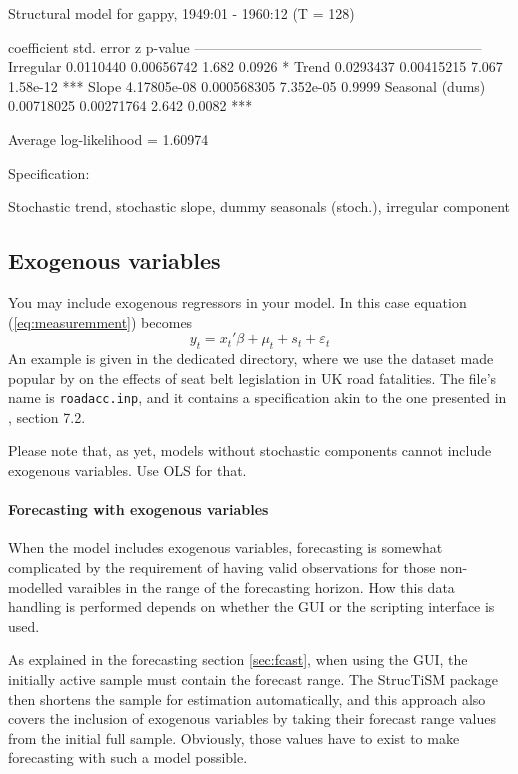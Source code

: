 \documentclass[a4paper,10pt]{article}
\begin{document}
\begin{code}
Structural model for gappy, 1949:01 - 1960:12 (T = 128)

                   coefficient  std. error       z      p-value 
  --------------------------------------------------------------
  Irregular        0.0110440    0.00656742   1.682      0.0926   *
  Trend            0.0293437    0.00415215   7.067      1.58e-12 ***
  Slope            4.17805e-08  0.000568305  7.352e-05  0.9999  
  Seasonal (dums)  0.00718025   0.00271764   2.642      0.0082   ***

Average log-likelihood = 1.60974


Specification:

Stochastic trend, stochastic slope, dummy seasonals (stoch.),
irregular component
\end{code}

\subsection{Exogenous variables}
\label{sec:exovar}

You may include exogenous regressors in your model. In this case
equation (\ref{eq:measuremment}) becomes
\begin{equation}
  \label{eq:exovar}
  y_t = x_t ' \beta + \mu_t + s_t + \varepsilon_t
\end{equation}
An example is given in the dedicated directory, where we use the
dataset made popular by \cite{Harvey1986} on the effects of seat belt
legislation in UK road fatalities. The file's name is
\verb|roadacc.inp|, and it contains a specification akin to the one
presented in \cite{CK2007}, section 7.2.

Please note that, as yet, models without stochastic components cannot
include exogenous variables. Use OLS for that.

\paragraph{Forecasting with exogenous variables}
When the model includes exogenous variables, forecasting is somewhat 
complicated by the requirement of having valid observations for those
non-modelled varaibles in the range of the forecasting horizon. How
this data handling is performed depends on whether the GUI or the 
scripting interface is used.

As explained in the forecasting section \ref{sec:fcast}, when using the 
GUI, the initially active sample must contain the forecast range. The 
StrucTiSM package then shortens the sample for estimation automatically, 
and this approach also covers the inclusion of exogenous variables by 
taking their forecast range values from the initial full sample. 
Obviously, those values have to exist to make forecasting with such a 
model possible.
\end{document}
